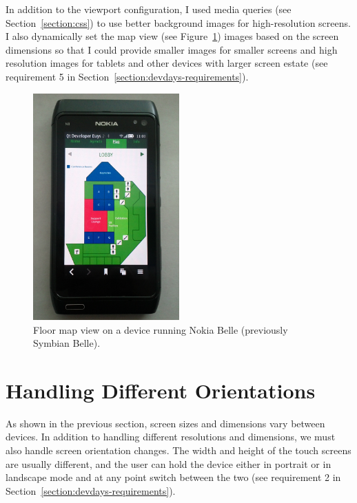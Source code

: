 In addition to the viewport configuration, I used media queries (see
Section~\ref{section:css}) to use better background images for
high-resolution screens. I also dynamically set the map view (see
Figure~\ref{figure:nokia-map.jpg}) images based on the screen
dimensions so that I could provide smaller images for smaller screens
and high resolution images for tablets and other devices with larger
screen estate (see requirement 5 in
Section~\ref{section:devdays-requirements}).

\begin{figure}[h!]
  \begin{center}
    \includegraphics[width=0.5\textwidth]{images/nokia-map.jpg}
    \caption{Floor map view on a device running Nokia Belle
      (previously Symbian Belle).}
    \label{figure:nokia-map.jpg}
  \end{center}
\end{figure}

\section{Handling Different Orientations}

As shown in the previous section, screen sizes and dimensions vary
between devices. In addition to handling different resolutions and
dimensions, we must also handle screen orientation changes. The width
and height of the touch screens are usually different, and the user
can hold the device either in portrait or in landscape mode and at any
point switch between the two (see requirement 2 in
Section~\ref{section:devdays-requirements}).

